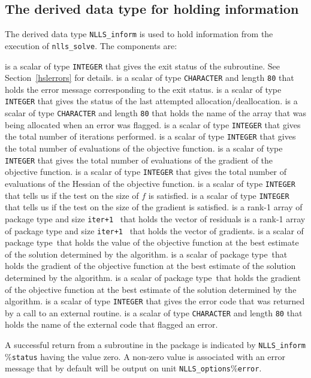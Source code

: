 \documentclass{spec}
\newcommand{\scalarinteger}{is a scalar of type {\tt INTEGER} }
\newcommand{\scalarcharacter}[1]{is a scalar of type {\tt CHARACTER} and length {\tt #1} }
\newcommand{\scalarreal}{is a scalar of package type\ }
\newcommand{\ronearrayreal}[1]{is a rank-1 array of package type and size {\tt #1}\ }
\begin{document}
\subsection{The derived data type for holding information}
\label{typeinform}
The derived data type {\tt NLLS\_inform} is used
to hold information from the execution of {\tt nlls\_solve}.
The components are:
\begin{description}
       \scalarinteger that gives the exit status of the subroutine.  See Section~\ref{hslerrors} for details.
       \scalarcharacter{80} that holds the error message corresponding to the exit status.
 \scalarinteger that gives the status of the last attempted allocation/deallocation.
 \scalarcharacter{80} that holds the name of the array that was being allocated when an error was flagged.
 \scalarinteger that gives the total number of iterations performed.
 \scalarinteger that gives the total number of evaluations of the objective function.
 \scalarinteger that gives the total number of evaluations of the gradient of the objective function.
 \scalarinteger that gives the total number of evaluations of the Hessian of the objective function.
 \scalarinteger that tells us if the test on the size of \(f\) is satisfied.
 \scalarinteger that tells us if the test on the size of the gradient is satisfied.
 \ronearrayreal{iter+1} that holds the vector of residuals
 \ronearrayreal{iter+1} that holds the vector of gradients.
 \scalarreal that holds the value of the objective function at the best estimate of the solution determined by the algorithm.
 \scalarreal that holds the gradient of the objective function at the best estimate of the solution determined by the algorithm.
 \scalarreal that holds the gradient of the objective function at the best estimate of the solution determined by the algorithm.
 \scalarinteger that gives the error code that was returned by a call to an external routine.
 \scalarcharacter{80} that holds the name of the external code that flagged an error.
\end{description}


\hslerrors

A successful return from a subroutine in the package is indicated by
{\tt NLLS\_inform$\%$status} having the value zero.
A non-zero value is associated with an error message that by default will
be output on unit {\tt NLLS\_options$\%$error}.
\end{document}
